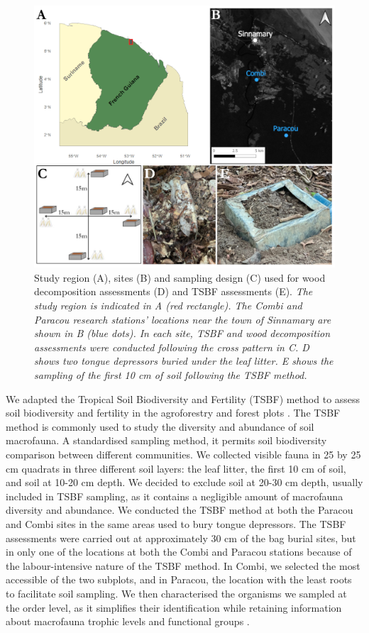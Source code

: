 \documentclass[fleqn,10pt]{ArtEcoFoG} %
\begin{document}
\begin{figure}

{\centering \includegraphics[width=0.8\linewidth,]{images/methodmaps} 

}

\caption{Study region (A), sites (B) and sampling design (C) used for wood decomposition assessments (D) and TSBF assessments (E). \textit{The study region is indicated in A (red rectangle). The Combi and Paracou research stations' locations near the town of Sinnamary are shown in B (blue dots). In each site, TSBF and wood decomposition assessments were conducted following the cross pattern in C. D shows two tongue depressors buried under the leaf litter. E shows the sampling of the first 10 cm of soil following the TSBF method.}}\label{fig:method}
\end{figure}

\normalsize

We adapted the Tropical Soil Biodiversity and Fertility (TSBF) method to assess soil biodiversity and fertility in the agroforestry and forest plots \citep{anderson_tropical_1989}. The TSBF method is commonly used to study the diversity and abundance of soil macrofauna. A standardised sampling method, it permits soil biodiversity comparison between different communities. We collected visible fauna in 25 by 25 cm quadrats in three different soil layers: the leaf litter, the first 10 cm of soil, and soil at 10-20 cm depth. We decided to exclude soil at 20-30 cm depth, usually included in TSBF sampling, as it contains a negligible amount of macrofauna diversity and abundance. We conducted the TSBF method at both the Paracou and Combi sites in the same areas used to bury tongue depressors. The TSBF assessments were carried out at approximately 30 cm of the bag burial sites, but in only one of the locations at both the Combi and Paracou stations because of the labour-intensive nature of the TSBF method. In Combi, we selected the most accessible of the two subplots, and in Paracou, the location with the least roots to facilitate soil sampling. We then characterised the organisms we sampled at the order level, as it simplifies their identification while retaining information about macrofauna trophic levels and functional groups \citep[following,][]{decaens_identification_2015}.
\end{document}
